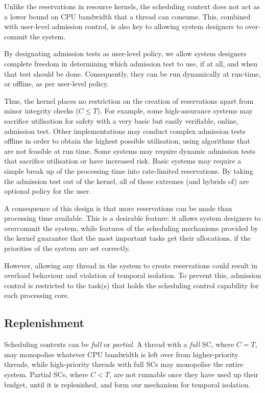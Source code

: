 Unlike the reservations in resource kernels, the scheduling context does not 
act as a lower bound on CPU bandwidth that a thread can consume. This, combined with
user-level admission control, is also key to allowing system designers to over-commit the system. 

By designating admission tests as user-level policy, we allow system designers complete freedom
in determining which admission test to use, if at all, and when that test should be done.
Consequently, they can be run dynamically at run-time, or offline, as per user-level policy.

Thus, the kernel places no restriction on the creation of reservations apart from minor integrity
checks (\ie $C \leq T$).
For example, some high-assurance systems may sacrifice utilisation for safety with a very basic but easily verifiable, online, admission test.
Other implementations may conduct complex admission tests offline in order to obtain the highest possible utilisation, using algorithms that are not feasible at run time.
Some systems may require dynamic admission tests that sacrifice utilisation or have increased risk.
Basic systems may require a simple break up of the processing time into rate-limited reservations.
By taking the admission test out of the kernel, all of these extremes (and hybrids of) are optional policy for the user.

A consequence of this design is that more reservations can be made than processing time available.
This is a desirable feature: it allows system designers to overcommit the system, while features of the scheduling mechanisms provided by the kernel guarantee that the most important tasks get their allocations, if the priorities of the system are set correctly.

However, allowing any thread in the system to create reservations could result in overload behaviour and violation of temporal isolation.
To prevent this, admission control is restricted to the task(s) that holds the scheduling
control capability for each processing core.

\subsection{Replenishment}

Scheduling contexts can be \emph{full} or \emph{partial}. A thread with a \emph{full} SC, where
\(C=T\), may monopolise whatever
CPU bandwidth is left over from higher-priority threads, while high-priority threads with full
\glspl{SC} may monopolise the entire system. 
Partial \glspl{SC}, where \(C<T\), are not runnable once
they have used up their budget, until it is replenished, and form our mechanism for temporal
isolation.  

